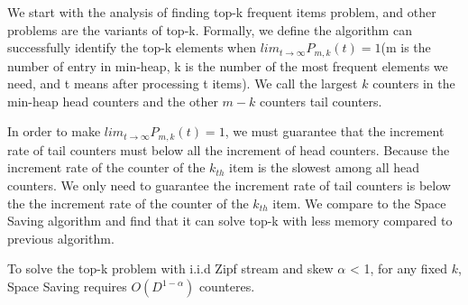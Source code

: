 We start with the analysis of finding top-k frequent items problem, and other problems are the variants of top-k. 
Formally, we define the algorithm can successfully identify the top-k elements when $lim_{t\to\infty} P_{m, k}(t) = 1$(m is the number of entry in min-heap, k is the number of the most frequent elements we need, and t means after processing t items). 
We call the largest $k$ counters in the min-heap head counters and the other $m-k$ counters tail counters.

In order to make $lim_{t\to\infty} P_{m, k}(t) = 1$, we must guarantee that the increment rate of tail counters must below all the increment of head counters. Because the increment rate of the counter of the $k_{th}$ item is the slowest among all head counters. We only need to guarantee the increment rate of tail counters is below the the increment rate of the counter of the $k_{th}$ item.
We compare to the Space Saving algorithm and find that it can solve top-k with less memory compared to previous algorithm. 

\begin{theorem}
	To solve the top-k problem with i.i.d Zipf stream and skew $\alpha$ < 1, for any fixed $k$, Space Saving requires $O(D^{1-\alpha})$ counteres.
\end{theorem}

